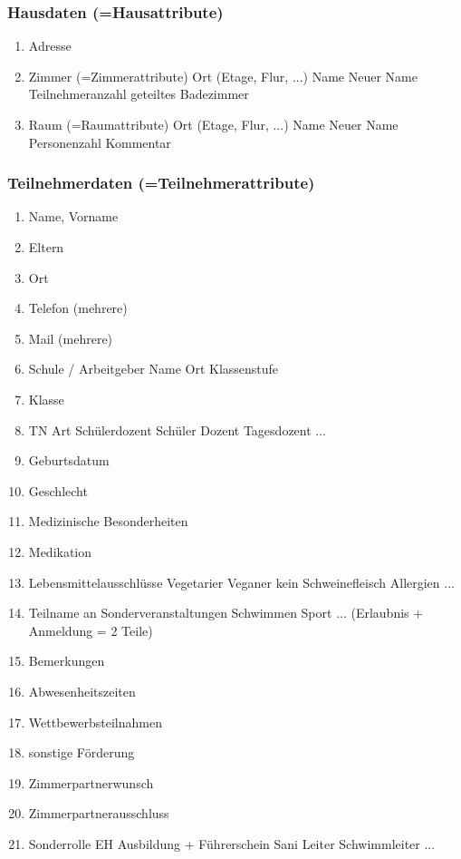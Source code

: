 \documentclass[a4paper]{scrartcl}
\begin{document}
	\subsubsection{Hausdaten (=Hausattribute)}
		\begin{enumerate}
			\item Adresse
			\item Zimmer  (=Zimmerattribute)
				\subitem Ort (Etage, Flur, ...)
				\subitem Name
				\subitem Neuer Name
				\subitem Teilnehmeranzahl
				\subitem geteiltes Badezimmer
			\item Raum  (=Raumattribute)
				\subitem Ort (Etage, Flur, ...)
				\subitem Name
				\subitem Neuer Name
				\subitem Personenzahl
				\subitem Kommentar
			\end{enumerate}

	\subsubsection{Teilnehmerdaten (=Teilnehmerattribute)}
	\begin{enumerate}
		\item Name, Vorname
		\item Eltern
		\item Ort
		\item Telefon (mehrere)
		\item Mail (mehrere)
		\item Schule / Arbeitgeber
		\subitem Name
		\subitem Ort
		\subitem Klassenstufe
		\item Klasse
		\item TN Art
		\subitem Schülerdozent
		\subitem Schüler
		\subitem Dozent
		\subitem Tagesdozent
		\subitem ...
		\item Geburtsdatum
		\item Geschlecht
		\item Medizinische Besonderheiten
		\item Medikation
		\item Lebensmittelausschlüsse
		\subitem Vegetarier
		\subitem Veganer
		\subitem kein Schweinefleisch
		\subitem Allergien
		\subitem ...
		\item Teilname an Sonderveranstaltungen
		\subitem Schwimmen
		\subitem Sport
		\subitem ...
		\subitem (Erlaubnis + Anmeldung = 2 Teile)
		\item Bemerkungen
		\item Abwesenheitszeiten
		\item Wettbewerbsteilnahmen
		\item sonstige Förderung
		\item Zimmerpartnerwunsch
		\item Zimmerpartnerausschluss
		\item Sonderrolle
		\subitem EH Ausbildung +
		\subitem Führerschein
		\subitem Sani
		\subitem Leiter
		\subitem Schwimmleiter
		\subitem ...
	\end{enumerate}
\end{document}
